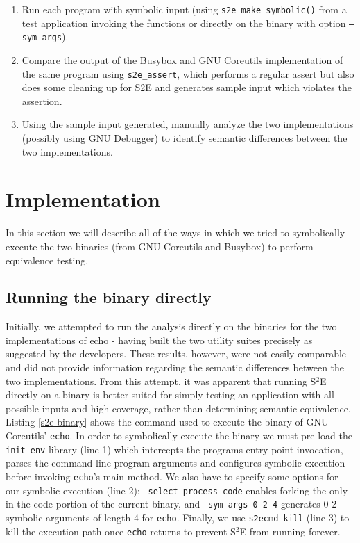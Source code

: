 \documentclass[conference]{IEEEtran}
\begin{document}
\begin{enumerate}
  \item Run each program with symbolic input (using {\tt s2e\_make\_symbolic()} from a test application invoking the functions or directly on the binary with option {\tt --sym-args}).
  \item Compare the output of the Busybox and GNU Coreutils implementation of the same program using {\tt s2e\_assert}, which performs a regular assert but also does some cleaning up for S2E and generates sample input which violates the assertion.
  \item Using the sample input generated, manually analyze the two implementations (possibly using GNU Debugger) to identify semantic differences between the two implementations. 
\end{enumerate}


\section{Implementation}

In this section we will describe all of the ways in which we tried to symbolically execute the two binaries (from GNU Coreutils and Busybox) to perform equivalence testing. 

\subsection{Running the binary directly}

Initially, we attempted to run the analysis directly on the binaries for the two implementations of echo - having built the two utility suites precisely as suggested by the developers. These results, however, were not easily comparable and did not provide information regarding the semantic differences between the two implementations. From this attempt, it was apparent that running S$^2$E directly on a binary is better suited for simply testing an application with all possible inputs and high coverage, rather than determining semantic equivalence. \\

Listing \ref{s2e-binary} shows the command used to execute the binary of GNU Coreutils' {\tt echo}. In order to symbolically execute the binary we must pre-load the {\tt init\_env} library (line 1) which intercepts the programs entry point invocation, parses the command line program arguments and configures symbolic execution before invoking {\tt echo}'s main method. We also have to specify some options for our symbolic execution (line 2); {\tt --select-process-code} enables forking the only in the code portion of the current binary, and {\tt --sym-args 0 2 4} generates 0-2 symbolic arguments of length 4 for {\tt echo}. Finally, we use {\tt s2ecmd kill} (line 3) to kill the execution path once {\tt echo} returns to prevent S$^2$E from running forever. \\
\end{document}
